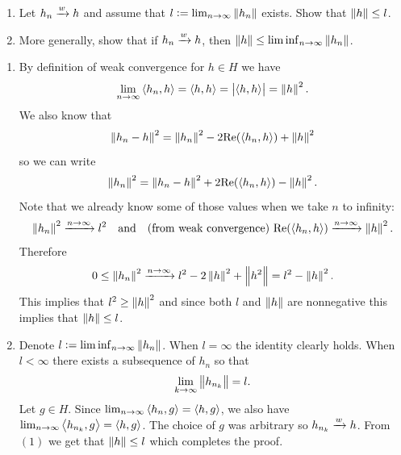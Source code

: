 \documentclass[11pt,a4paper]{article}
\begin{document}
\begin{exercise} \phantom{}
  \begin{enumerate}
    \item[(1)] Let $h_n \xrightarrow{w} h$ and assume
      that $l := \lim_{n \to \infty} \left\lVert h_n\right\rVert$ exists.
      Show that $\left\lVert h\right\rVert \le l$.
    \item[(2)] More generally, show that if $h_n \xrightarrow{w} h$,
      then $\left\lVert h\right\rVert \le \liminf_{n \to \infty} \left\lVert h_n\right\rVert$.
  \end{enumerate}
\end{exercise}
\begin{solution} \phantom{}
  \begin{enumerate}
    \item[(1)] By definition of weak convergence for $h \in H$ we have
      \[
        \lim_{n \to \infty} \left\langle h_n, h \right\rangle =
        \left\langle h, h \right\rangle =
        \left\lvert\left\langle h, h \right\rangle\right\rvert =
        \left\lVert h\right\rVert^2.
      \]
      We also know that
      \[
        \left\lVert h_n - h\right\rVert^2 =
        \left\lVert h_n\right\rVert^2 - 2\mathrm{Re}(\left\langle h_n, h \right\rangle) + \left\lVert h\right\rVert^2
      \]
      so we can write
      \[
        \left\lVert h_n\right\rVert^2 =
        \left\lVert h_n - h\right\rVert^2 + 2\mathrm{Re}(\left\langle h_n, h \right\rangle) - \left\lVert h\right\rVert^2.
      \]
      Note that we already know some of those values when we take $n$
      to infinity:
      \[
        \left\lVert h_n\right\rVert^2 \xrightarrow{n \to \infty} l^2 \quad \text{and} \quad
        \text{(from weak convergence) }
        \mathrm{Re}(\left\langle h_n, h \right\rangle) \xrightarrow{n \to \infty} \left\lVert h\right\rVert^2.
      \]
      Therefore
      \[
        0 \le
        \left\lVert h_n\right\rVert^2 \xrightarrow{n \to \infty}
        l^2 - 2\left\lVert h\right\rVert^2 + \left\lVert h^2\right\rVert = l^2 - \left\lVert h\right\rVert^2.
      \]
      This implies that $l^2 \geq \left\lVert h\right\rVert^2$ and since both $l$
      and $\left\lVert h\right\rVert$ are nonnegative this implies that $\left\lVert h\right\rVert \le l$.
    \item[(2)] Denote $l := \liminf_{n \to \infty} \left\lVert h_n\right\rVert$.
      When $l = \infty$ the identity clearly holds.
      When $l < \infty$ there exists a subsequence of $h_n$ so that
      \[
        \lim_{k \to \infty} \left\lVert h_{n_k}\right\rVert = l.
      \]
      Let $g \in H$.
      Since $\lim_{n \to \infty} \left\langle h_n, g \right\rangle = \left\langle h, g \right\rangle$,
      we also have $\lim_{n \to \infty} \left\langle h_{n_k}, g \right\rangle = \left\langle h, g \right\rangle$.
      The choice of $g$ was arbitrary so $h_{n_k} \xrightarrow{w} h$.
      From $(1)$ we get that $\left\lVert h\right\rVert \le l$ which completes the proof.
  \end{enumerate}
\end{solution}
\end{document}
